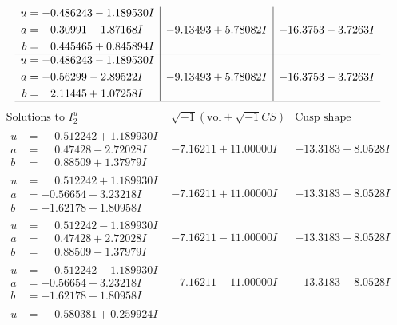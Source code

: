 \documentclass[1p]{elsarticle_modified}
\theoremstyle{definition}
\newcommand{\I}{\sqrt{-1}}
\begin{document}
$$\begin{array}{c|c|c}
\begin{aligned}
u &= -0.486243 - 1.189530 I \\
a &= -0.30991 - 1.87168 I \\
b &= \phantom{-}0.445465 + 0.845894 I\end{aligned}
 & -9.13493 + 5.78082 I & -16.3753 - 3.7263 I \\ \hline\begin{aligned}
u &= -0.486243 - 1.189530 I \\
a &= -0.56299 - 2.89522 I \\
b &= \phantom{-}2.11445 + 1.07258 I\end{aligned}
 & -9.13493 + 5.78082 I & -16.3753 - 3.7263 I\\
 \hline 
 \end{array}$$\newpage$$\begin{array}{c|c|c}  
\text{Solutions to }I^u_{2}& \I (\text{vol} + \sqrt{-1}CS) & \text{Cusp shape}\\
 \hline 
\begin{aligned}
u &= \phantom{-}0.512242 + 1.189930 I \\
a &= \phantom{-}0.47428 - 2.72028 I \\
b &= \phantom{-}0.88509 + 1.37979 I\end{aligned}
 & -7.16211 + 11.00000 I & -13.3183 - 8.0528 I \\ \hline\begin{aligned}
u &= \phantom{-}0.512242 + 1.189930 I \\
a &= -0.56654 + 3.23218 I \\
b &= -1.62178 - 1.80958 I\end{aligned}
 & -7.16211 + 11.00000 I & -13.3183 - 8.0528 I \\ \hline\begin{aligned}
u &= \phantom{-}0.512242 - 1.189930 I \\
a &= \phantom{-}0.47428 + 2.72028 I \\
b &= \phantom{-}0.88509 - 1.37979 I\end{aligned}
 & -7.16211 - 11.00000 I & -13.3183 + 8.0528 I \\ \hline\begin{aligned}
u &= \phantom{-}0.512242 - 1.189930 I \\
a &= -0.56654 - 3.23218 I \\
b &= -1.62178 + 1.80958 I\end{aligned}
 & -7.16211 - 11.00000 I & -13.3183 + 8.0528 I \\ \hline\begin{aligned}
u &= \phantom{-}0.580381 + 0.259924 I \\

\end{aligned}
\end{array}$$
\end{document}

